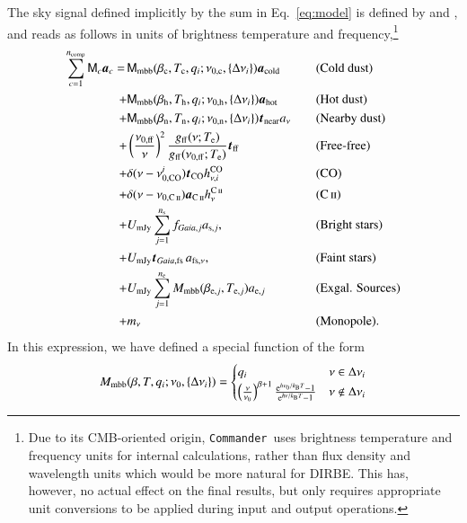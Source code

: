 \documentclass{aa}
\def\commander{\texttt{Commander}}
\def\GAIA{\textit{Gaia}}
\def\gaia{\textit{Gaia}}
\newcommand{\CII}{\ensuremath{\textsc{C\,ii}}}
\renewcommand{\t}[0]{\vec{t}}
\renewcommand{\a}[0]{\vec{a}}
\newcommand{\M}[0]{\tens{M}}
\newcommand{\Te}[0]{T_{\rm e}}
\newcommand{\e}{\mathrm e}
\def\Tcold{\ifmmode T_\mathrm{c}\else $T_{\mathrm{c}}$\fi}
\def\Thot{\ifmmode T_\mathrm{h}\else $T_{\mathrm{h}}$\fi}
\def\Tnear{\ifmmode T_\mathrm{n}\else $T_{\mathrm{n}}$\fi}
\def\bcold{\ifmmode \beta_\mathrm{c}\else $\beta_{\mathrm{c}}$\fi}
\def\bhot{\ifmmode \beta_\mathrm{h}\else $\beta_{\mathrm{h}}$\fi}
\def\bnear{\ifmmode \beta_\mathrm{n}\else $\beta_{\mathrm{n}}$\fi}
\def\nuzeroff{\ifmmode \nu_{0,\mathrm{ff}}\else $\nu_{0,\mathrm{ff}}$\fi}
\def\nuzerocold{\ifmmode \nu_{0,\mathrm{c}}\else $\nu_{0,\mathrm{c}}$\fi}
\def\nuzerohot{\ifmmode \nu_{0,\mathrm{h}}\else $\nu_{0,\mathrm{h}}$\fi}
\def\nuzeronear{\ifmmode \nu_{0,\mathrm{n}}\else $\nu_{0,\mathrm{n}}$\fi}
\def\Te{\ifmmode T_{\mathrm{e}}\else $T_{\mathrm{e}}$\fi}
\def\kB{\ifmmode k_\mathrm{B}\else $k_{\mathrm{B}}$\fi}
\begin{document}
The sky signal defined implicitly by the sum in Eq.~\eqref{eq:model}
is defined by \citet{CG02_04} and \citet{CG02_05}, and reads as follows in units
of brightness temperature and frequency,\footnote{Due to its
CMB-oriented origin, \commander\ uses brightness temperature and
frequency units for internal calculations, rather than flux density
and wavelength units which would be more natural for DIRBE. This has,
however, no actual effect on the final results, but only requires
appropriate unit conversions to be applied during input and output
operations. }
\begin{alignat}{4}
  \sum_{c=1}^{n_{\mathrm{comp}}} \M_c \a_c  = \,
  &\M_{\mathrm{mbb}}(\bcold,\Tcold, q_i;\nuzerocold,\{\Delta\nu_i\})\vec{a}_{\mathrm{cold}}
  && \textrm{(Cold dust)}\nonumber\\ %
  + &\M_{\mathrm{mbb}}(\bhot,\Thot, q_i;\nuzerohot,\{\Delta\nu_i\})
  \vec{a}_{\mathrm{hot}} && \textrm{(Hot dust)}\nonumber \\
  + &\M_{\mathrm{mbb}}(\bnear,\Tnear,q_i;\nuzeronear,\{\Delta\nu_i\}) \t_{\mathrm{near}}
  a_{\nu} && \textrm{(Nearby dust)} \nonumber \\
  + &\left(\frac{\nuzeroff}{\nu}\right)^2
  \frac{g_{\mathrm{ff}}(\nu;\Te) }{g_{\mathrm{ff}}(\nuzeroff;\Te)}
  \vec{t}_{\mathrm{ff}} && \textrm{(Free-free)} \nonumber\\
  + &\delta(\nu-\nu_{0,\mathrm{CO}}^i) \t_{\mathrm{CO}}
  h^{\mathrm{CO}}_{\nu,i} && \textrm{(CO)}\nonumber\\
	+ &\delta(\nu-\nu_{0,\CII}) \a_{\CII}
  h^{\CII}_{\nu} && (\CII) \nonumber\\
  + &U_{\mathrm{mJy}} \sum_{j=1}^{n_{\mathrm{s}}}
  f_{\GAIA,j} a_{\mathrm{s},j}, &\quad&
  \textrm{(Bright stars)} \nonumber\\
  + &U_{\mathrm{mJy}} \t_{\gaia,\mathrm{fs}}\, a_{\mathrm{fs},\nu}, &\quad&
  \textrm{(Faint stars)} \nonumber\\  
    + &U_{\mathrm{mJy}} \sum_{j=1}^{n_{\mathrm{e}}}
  M_{\mathrm{mbb}}(\beta_{\mathrm{e},j},
  T_{\mathrm{e},j})
  a_{\mathrm{e},j} && \textrm{(Exgal. Sources)}\nonumber\\
  + &m_{\nu} && \textrm{(Monopole)}. \nonumber
\end{alignat}
In this expression, we have defined a special function of the form
\begin{equation}
  M_{\mathrm{mbb}}(\beta, T, q_i;\nu_0, \{\Delta\nu_i\}) =
    \begin{cases}
      q_i & \nu \in \Delta\nu_i\\
      \left(\frac{\nu}{\nu_0}\right)^{\beta+1}
  \frac{\e^{h\nu_0/\kB T}-1}{\e^{h\nu/\kB T}-1} & \nu \notin \Delta\nu_i
    \end{cases}       
\end{equation}
\end{document}
